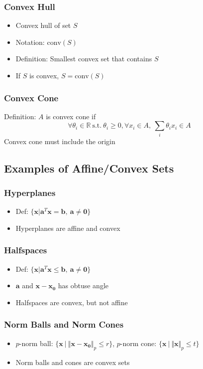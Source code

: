 \subsubsection*{Convex Hull}
\begin{itemize}
    \item Convex hull of set $S$
    \item Notation: $\mathrm{conv}(S)$
    \item Definition: Smallest convex set that contains $S$
    \item If $S$ is convex, $S = \mathrm{conv}(S)$
\end{itemize}

\subsubsection*{Convex Cone}
Definition: $A$ is convex cone if
$$
    \forall \theta_i \in \mathbb{R}~\mathrm{s.t.}~\theta_i \geq 0, \forall x_i \in A,~\sum_i \theta_i x_i \in A
$$
Convex cone must include the origin

\subsection{Examples of Affine/Convex Sets}

\subsubsection*{Hyperplanes}
\begin{itemize}
    \item Def: $\{\mathbf{x}|\mathbf{a}^T\mathbf{x} = \mathbf{b},~\mathbf{a} \neq \mathbf{0}\}$
    \item Hyperplanes are affine and convex
\end{itemize}

\subsubsection*{Halfspaces}
\begin{itemize}
    \item Def: $\{\mathbf{x}|\mathbf{a}^T\mathbf{x} \leq \mathbf{b},~\mathbf{a}\neq\mathbf{0}\}$
    \item $\mathbf{a}$ and $\mathbf{x} - \mathbf{x_0}$ has obtuse angle
    \item Halfspaces are convex, but not affine
\end{itemize}

\subsubsection*{Norm Balls and Norm Cones}
\begin{itemize}
    \item $p$-norm ball: $\{\mathbf{x}~|~\Vert \mathbf{x} - \mathbf{x_0} \Vert_p \leq r\}$, 
        $p$-norm cone: $\{\mathbf{x}~|~\Vert \mathbf{x} \Vert_p \leq t\}$
    \item Norm balls and cones are convex sets
\end{itemize}

